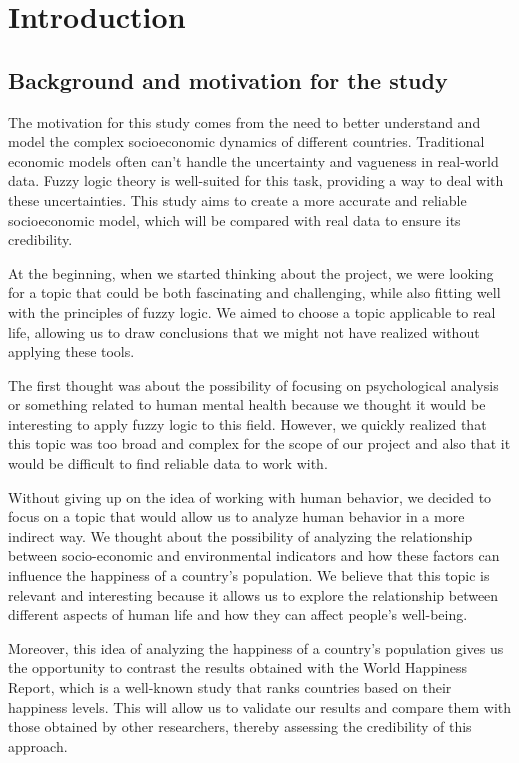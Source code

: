 \documentclass[fleqn,11pt]{article}
\begin{document}


\newpage
\tableofcontents

\newpage

\section{Introduction}

\subsection{Background and motivation for the study}
The motivation for this study comes from the need to better understand and model the complex socioeconomic dynamics of different countries.
Traditional economic models often can't handle the uncertainty and vagueness in real-world data.
Fuzzy logic theory is well-suited for this task, providing a way to deal with these uncertainties.
This study aims to create a more accurate and reliable socioeconomic model, which will be compared with real data to ensure its credibility.

At the beginning, when we started thinking about the project, we were looking for a topic that could be both fascinating and challenging, while also fitting well with the principles of fuzzy logic. We aimed to choose a topic applicable to real life, allowing us to draw conclusions that we might not have realized without applying these tools.

The first thought was about the possibility of focusing on psychological analysis or something related to human mental health because we thought it would be interesting to apply fuzzy logic to this field. However, we quickly realized that this topic was too broad and complex for the scope of our project and also that it would be difficult to find reliable data to work with.

Without giving up on the idea of working with human behavior, we decided to focus on a topic that would allow us to analyze human behavior in a more indirect way. We thought about the possibility of analyzing the relationship between socio-economic and environmental indicators and how these factors can influence the happiness of a country's population. We believe that this topic is relevant and interesting because it allows us to explore the relationship between different aspects of human life and how they can affect people's well-being.

Moreover, this idea of analyzing the happiness of a country's population gives us the opportunity to contrast the results obtained with the World Happiness Report, which is a well-known study that ranks countries based on their happiness levels. This will allow us to validate our results and compare them with those obtained by other researchers, thereby assessing the credibility of this approach.
\end{document}
